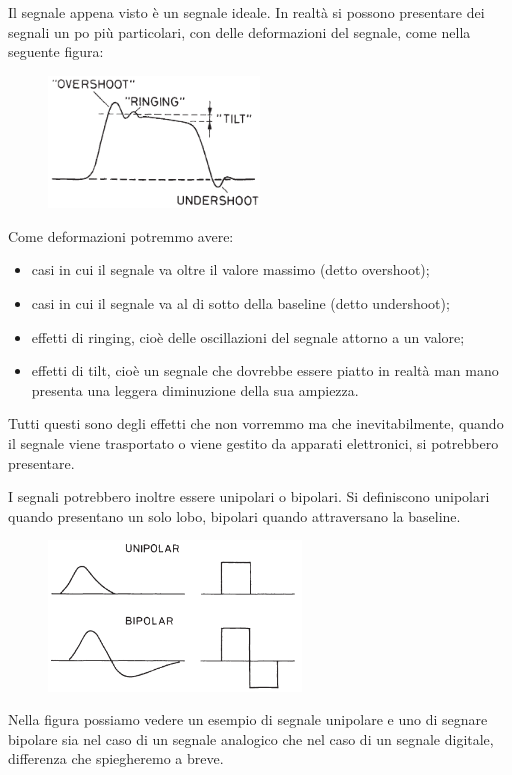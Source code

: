 Il segnale appena visto è un segnale ideale. In realtà si possono presentare dei segnali un po più particolari, con delle deformazioni del segnale, come nella seguente figura:
\begin{figure}[H]
   \centering
   \includegraphics[width=0.5\textwidth]{immagini/terminologia_segnali_2.png}
\end{figure}
Come deformazioni potremmo avere:
\begin{itemize}[leftmargin=0.5cm]
   \item casi in cui il segnale va oltre il valore massimo (detto overshoot);
   \item casi in cui il segnale va al di sotto della baseline (detto undershoot);
   \item effetti di ringing, cioè delle oscillazioni del segnale attorno a un valore;
   \item effetti di tilt, cioè un segnale che dovrebbe essere piatto in realtà man mano presenta una leggera diminuzione della sua ampiezza.
\end{itemize}
Tutti questi sono degli effetti che non vorremmo ma che inevitabilmente, quando il segnale viene trasportato o viene gestito da apparati elettronici, si potrebbero presentare.

\vspace{0.2cm}I segnali potrebbero inoltre essere unipolari o bipolari. Si definiscono unipolari quando presentano un solo lobo, bipolari quando attraversano la baseline.
\begin{figure}[H]
   \centering
   \includegraphics[width=0.6\textwidth]{immagini/segnali_unipolari_e_bipolari.png}
\end{figure}
Nella figura possiamo vedere un esempio di segnale unipolare e uno di segnare bipolare sia nel caso di un segnale analogico che nel caso di un segnale digitale, differenza che spiegheremo a breve.

